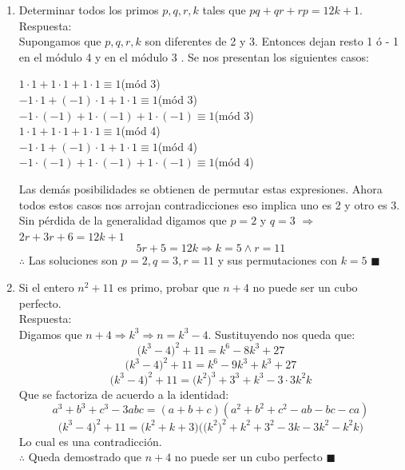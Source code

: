 \documentclass{book}
\begin{document}
\begin{enumerate}
    \item Determinar todos los primos $p,q,r,k$ tales que $pq+qr+rp= 12k + 1$.\\
          Respuesta:\\
          Supongamos que $p,q,r,k$ son diferentes de 2 y 3. Entonces dejan resto 1 ó - 1 en el módulo 4 y en el módulo 3 . Se nos presentan los siguientes casos:
          \begin{center}
              $1 \cdot 1 + 1 \cdot 1 + 1 \cdot 1 \equiv 1$(mód 3) \\
              $-1 \cdot 1 + (-1) \cdot 1 + 1 \cdot 1 \equiv 1$(mód 3)\\
              $-1 \cdot (-1) + 1 \cdot (-1) + 1 \cdot (-1) \equiv 1$(mód 3)\\
              $1 \cdot 1 + 1 \cdot 1 + 1 \cdot 1 \equiv 1$(mód 4)\\
              $-1 \cdot 1 + (-1) \cdot 1 + 1 \cdot 1 \equiv 1$(mód 4) \\
              $-1 \cdot (-1) + 1 \cdot (-1) + 1 \cdot (-1) \equiv 1$(mód 4) \\
          \end{center}
          Las demás posibilidades se obtienen de permutar estas expresiones. Ahora todos estos casos nos arrojan contradicciones eso implica uno es 2 y otro es 3.\\
          Sin pérdida de la generalidad digamos que $p= 2$ y $q= 3$ $\Rightarrow$ $2r + 3r + 6 = 12k + 1$
          $$5r + 5 = 12k \Rightarrow k = 5 \wedge r= 11$$
          $\therefore$ Las soluciones son $p= 2, q= 3, r= 11$ y sus permutaciones con $k= 5$ $\blacksquare$ \\
    \item Si el entero $n^2 + 11$ es primo, probar que $n + 4$ no puede ser un cubo perfecto.\\
          Respuesta:\\
          Digamos que $n + 4 \Rightarrow k^3\Rightarrow n = k^3 - 4$. Sustituyendo nos queda que:
          $$\big(k^3 - 4\big)^2 + 11 = k^6 - 8k^3 + 27$$
          $$\big(k^3 - 4\big)^2 + 11 = k^6 - 9k^3 + k^3 + 27$$
          $$\big(k^3 - 4\big)^2 + 11 = \big(k^2\big)^3 + 3^3 + k^3 - 3 \cdot 3k^2k$$
          Que se factoriza de acuerdo a la identidad:
          $$a^3 + b^3 + c^3 - 3abc = (a + b + c)(a^2 + b^2 + c^2 - ab - bc - ca)$$
          $$\big(k^3 - 4\big)^2 + 11 = \big(k^2 + k + 3\big)\big(\big(k^2\big)^2 + k^2 + 3^2 - 3k - 3k^2 - k^2k\big)$$
          Lo cual es una contradicción. \\
          $\therefore$ Queda demostrado que $n + 4$ no puede ser un cubo perfecto $\blacksquare$\\

\end{enumerate}
\end{document}
